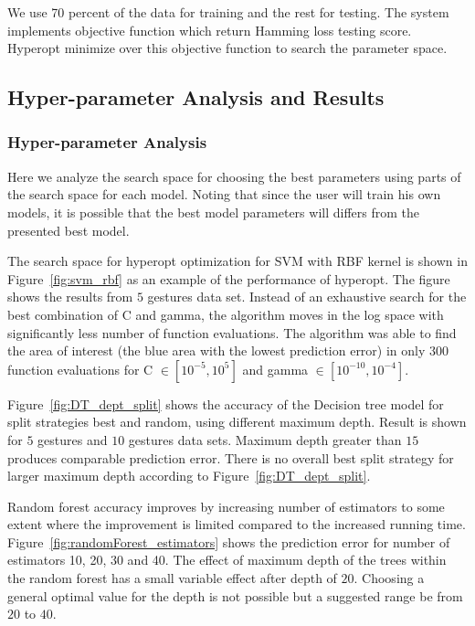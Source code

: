 \documentclass{article}
\begin{document}
We use 70 percent of the data for training and the rest for testing. The system implements objective function which return Hamming loss testing score. Hyperopt minimize over this objective function to search the parameter space.

\subsection{Hyper-parameter Analysis and Results}

\subsubsection{Hyper-parameter Analysis}
Here we analyze the search space for choosing the best parameters using parts of the search space for each model. Noting that since the user will train his own models, it is possible that the best model parameters will differs from the presented best model.

The search space for hyperopt optimization for SVM with RBF kernel is shown in Figure~\ref{fig:svm_rbf} as an example of the performance of hyperopt. The figure shows the results from $5$ gestures data set. Instead of an exhaustive search for the best combination of C and gamma, the algorithm moves in the log space with significantly less number of function evaluations. The algorithm was able to find the area of interest (the blue area with the lowest prediction error) in only $300$ function evaluations for C $\in [10^{-5}, 10^{5}]$ and gamma $\in [10^{-10}, 10^{-4}]$.


Figure~\ref{fig:DT_dept_split} shows the accuracy of the Decision tree model for split strategies best and random, using different maximum depth. Result is shown for $5$ gestures and $10$ gestures data sets. Maximum depth greater than $15$ produces comparable prediction error. There is no overall best split strategy for larger maximum depth according to Figure~\ref{fig:DT_dept_split}.

Random forest accuracy improves by increasing number of estimators to some extent where the improvement is limited compared to the increased running time. Figure~\ref{fig:randomForest_estimators} shows the prediction error for number of estimators 10, 20, 30 and 40. The effect of maximum depth of the trees within the random forest has a small variable effect after depth of $20$. Choosing a general optimal value for the depth is not possible but a suggested range be from $20$ to $40$.
\end{document}

